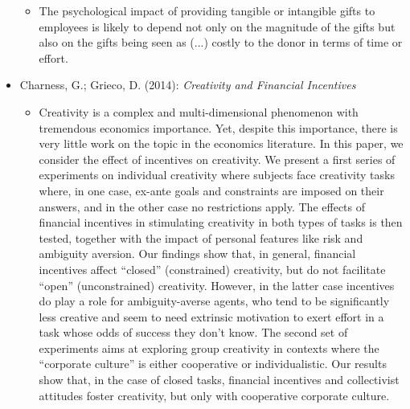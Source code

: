 \begin{itemize}
\begin{itemize}
			\item The psychological impact of providing tangible or intangible gifts to employees is likely to depend not only on the magnitude of the gifts but also on the gifts being seen as (...) costly to the donor in terms of time or effort.
		\end{itemize}
	\item Charness, G.; Grieco, D. (2014): \textit{Creativity and Financial Incentives} 
		\begin{itemize}
			\item Creativity is a complex and multi-dimensional phenomenon with tremendous economics importance. Yet, despite this importance, there is very little work on the topic in the economics literature. In this paper, we consider the effect of incentives on creativity. We present a first series of experiments on individual creativity where subjects face creativity tasks where, in one case, ex-ante goals and constraints are imposed on their answers, and in the other case no restrictions apply. The effects of financial incentives in stimulating creativity in both types of tasks is then tested, together with the impact of personal features like risk and ambiguity aversion. Our findings show that, in general, financial incentives affect “closed” (constrained) creativity, but do not facilitate “open” (unconstrained) creativity. However, in the latter case incentives do play a role for ambiguity-averse agents, who tend to be significantly less creative and seem to need extrinsic motivation to exert effort in a task whose odds of success they don’t know. The second set of experiments aims at exploring group creativity in contexts where the “corporate culture” is either cooperative or individualistic. Our results show that, in the case of closed tasks, financial incentives and collectivist attitudes foster creativity, but only with cooperative corporate culture.
		\end{itemize}
\end{itemize}


\newpage